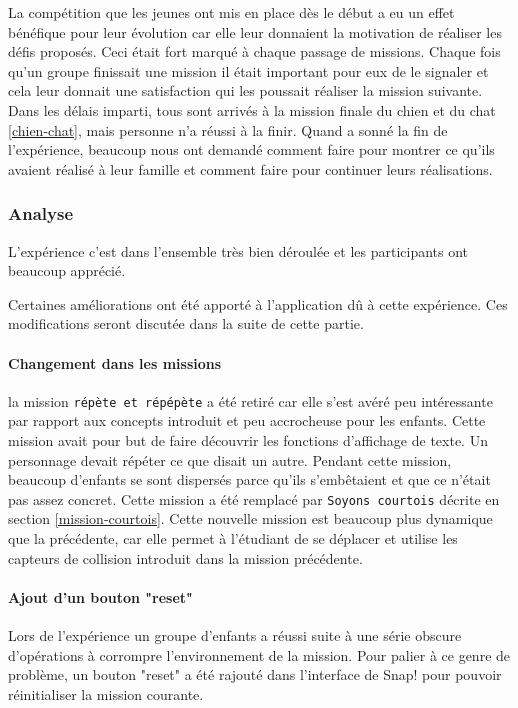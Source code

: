 La compétition que les jeunes ont mis en place dès le début a eu un effet bénéfique pour leur évolution car elle leur donnaient la motivation de réaliser les défis proposés. Ceci était fort marqué à chaque passage de missions. Chaque fois qu'un groupe finissait une mission il était important pour eux de le signaler et cela leur donnait une satisfaction qui les poussait réaliser la mission suivante.\\ %

Dans les délais imparti, tous sont arrivés à la mission finale du chien et du chat \ref{chien-chat}, mais personne n'a réussi à la finir. Quand a sonné la fin de l'expérience, beaucoup nous ont demandé comment faire pour montrer ce qu'ils avaient réalisé à leur famille et comment faire pour continuer leurs réalisations.

\subsubsection{Analyse}
\label{analyse-kidscode}
L'expérience c'est dans l'ensemble très bien déroulée et les participants ont beaucoup apprécié.

Certaines améliorations ont été apporté à l'application dû à cette expérience. Ces modifications seront discutée dans la suite de cette partie.

\paragraph{Changement dans les missions}
la mission \texttt{répète et répépète} a été retiré car elle s'est avéré peu intéressante par rapport aux concepts introduit et peu accrocheuse pour les enfants. Cette mission avait pour but de faire découvrir les fonctions d'affichage de texte. Un personnage devait répéter ce que disait un autre. Pendant cette mission, beaucoup d'enfants se sont dispersés parce qu'ils s'embêtaient et que ce n'était pas assez concret. Cette mission a été remplacé par \texttt{Soyons courtois} décrite en section \ref{mission-courtois}. Cette nouvelle mission est beaucoup plus dynamique que la précédente, car elle permet à l'étudiant de se déplacer et utilise les capteurs de collision introduit dans la mission précédente.

\paragraph{Ajout d'un bouton "reset"}
Lors de l'expérience un groupe d'enfants a réussi suite à une série obscure d'opérations à corrompre l'environnement de la mission. Pour palier à ce genre de problème, un bouton "reset" a été rajouté dans l'interface de Snap! pour pouvoir réinitialiser la mission courante.

